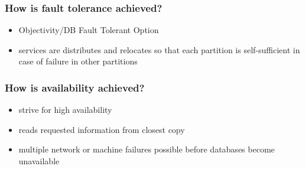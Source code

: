 \begin{frame}
\frametitle{How is fault tolerance achieved?}
\begin{itemize}
\item Objectivity/DB Fault Tolerant Option
\item services are distributes and relocates so that each partition is self-sufficient in case of  failure in other partitions
	
\end{itemize}
\end{frame} 
\begin{frame}

\frametitle{How is availability achieved?}
\begin{itemize}
\item strive for high availability 
\item reads requested information from closest copy
\item	multiple network or machine failures possible before databases become unavailable
\end{itemize}
\end{frame} 
